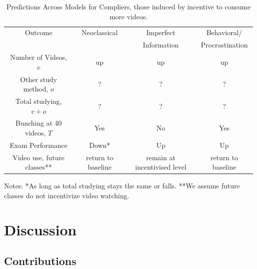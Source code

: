 \documentclass[12pt]{article}
\begin{document}
\begin{table}
	\caption{Predictions Across Models for Compliers, those induced by incentive to consume more videos.}
	\centering
	\begin{tabular}{ c|c|c|c }
		Outcome & Neoclassical & Imperfect& Behavioral/ \\
		& & Information & Procrastination\\
		\hline
		Number of Videos, $v$ & up & up & up \\
		Other study method, $o$ & ? & ? & ?\\
		Total studying, $v+o$ & ? & ? & ? \\
		Bunching at 40 videos, $T$ & Yes & No & Yes \\
		Exam Performance & Down* & Up & Up\\
		Video use, future classes** & return to baseline & remain at incentivised level & return to baseline \\
		\hline
	\end{tabular}
	Notes: *As long as total studying stays the same or falls. **We assume future classes do not incentivize video watching.
	\label{modelpredictions}

\end{table}



\section{Discussion} \label{discussion}

\subsection{Contributions}
\end{document}
